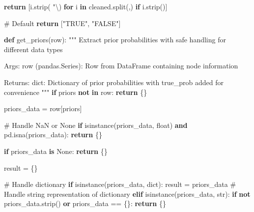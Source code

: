 \documentclass[
  11pt,
  letterpaper,
]{book}
\newenvironment{Shaded}{\begin{snugshade}}{\end{snugshade}}
\newcommand{\BuiltInTok}[1]{\textcolor[rgb]{0.00,0.23,0.31}{#1}}
\newcommand{\CharTok}[1]{\textcolor[rgb]{0.13,0.47,0.30}{#1}}
\newcommand{\CommentTok}[1]{\textcolor[rgb]{0.37,0.37,0.37}{#1}}
\newcommand{\ControlFlowTok}[1]{\textcolor[rgb]{0.00,0.23,0.31}{\textbf{#1}}}
\newcommand{\KeywordTok}[1]{\textcolor[rgb]{0.00,0.23,0.31}{\textbf{#1}}}
\newcommand{\NormalTok}[1]{\textcolor[rgb]{0.00,0.23,0.31}{#1}}
\newcommand{\OperatorTok}[1]{\textcolor[rgb]{0.37,0.37,0.37}{#1}}
\newcommand{\SpecialCharTok}[1]{\textcolor[rgb]{0.37,0.37,0.37}{#1}}
\newcommand{\StringTok}[1]{\textcolor[rgb]{0.13,0.47,0.30}{#1}}
\newcommand{\VariableTok}[1]{\textcolor[rgb]{0.07,0.07,0.07}{#1}}
\begin{document}
\begin{Shaded}
\begin{Highlighting}[]
        \ControlFlowTok{return}\NormalTok{ [i.strip(}\StringTok{\textquotesingle{} "}\CharTok{\textbackslash{}\textquotesingle{}}\StringTok{\textquotesingle{}}\NormalTok{) }\ControlFlowTok{for}\NormalTok{ i }\KeywordTok{in}\NormalTok{ cleaned.split(}\StringTok{\textquotesingle{},\textquotesingle{}}\NormalTok{) }\ControlFlowTok{if}\NormalTok{ i.strip()]}

    \CommentTok{\# Default}
    \ControlFlowTok{return}\NormalTok{ [}\StringTok{"TRUE"}\NormalTok{, }\StringTok{"FALSE"}\NormalTok{]}

\KeywordTok{def}\NormalTok{ get\_priors(row):}
    \CommentTok{"""}
\CommentTok{    Extract prior probabilities with safe handling for different data types}

\CommentTok{    Args:}
\CommentTok{        row (pandas.Series): Row from DataFrame containing node information}

\CommentTok{    Returns:}
\CommentTok{        dict: Dictionary of prior probabilities with \textquotesingle{}true\_prob\textquotesingle{} added for convenience}
\CommentTok{    """}
    \ControlFlowTok{if} \StringTok{\textquotesingle{}priors\textquotesingle{}} \KeywordTok{not} \KeywordTok{in}\NormalTok{ row:}
        \ControlFlowTok{return}\NormalTok{ \{\}}

\NormalTok{    priors\_data }\OperatorTok{=}\NormalTok{ row[}\StringTok{\textquotesingle{}priors\textquotesingle{}}\NormalTok{]}

    \CommentTok{\# Handle NaN or None}
    \ControlFlowTok{if} \BuiltInTok{isinstance}\NormalTok{(priors\_data, }\BuiltInTok{float}\NormalTok{) }\KeywordTok{and}\NormalTok{ pd.isna(priors\_data):}
        \ControlFlowTok{return}\NormalTok{ \{\}}

    \ControlFlowTok{if}\NormalTok{ priors\_data }\KeywordTok{is} \VariableTok{None}\NormalTok{:}
        \ControlFlowTok{return}\NormalTok{ \{\}}

\NormalTok{    result }\OperatorTok{=}\NormalTok{ \{\}}

    \CommentTok{\# Handle dictionary}
    \ControlFlowTok{if} \BuiltInTok{isinstance}\NormalTok{(priors\_data, }\BuiltInTok{dict}\NormalTok{):}
\NormalTok{        result }\OperatorTok{=}\NormalTok{ priors\_data}
    \CommentTok{\# Handle string representation of dictionary}
    \ControlFlowTok{elif} \BuiltInTok{isinstance}\NormalTok{(priors\_data, }\BuiltInTok{str}\NormalTok{):}
        \ControlFlowTok{if} \KeywordTok{not}\NormalTok{ priors\_data.strip() }\KeywordTok{or}\NormalTok{ priors\_data }\OperatorTok{==} \StringTok{\textquotesingle{}}\SpecialCharTok{\{\}}\StringTok{\textquotesingle{}}\NormalTok{:}
            \ControlFlowTok{return}\NormalTok{ \{\}}


\end{Highlighting}
\end{Shaded}
\end{document}
